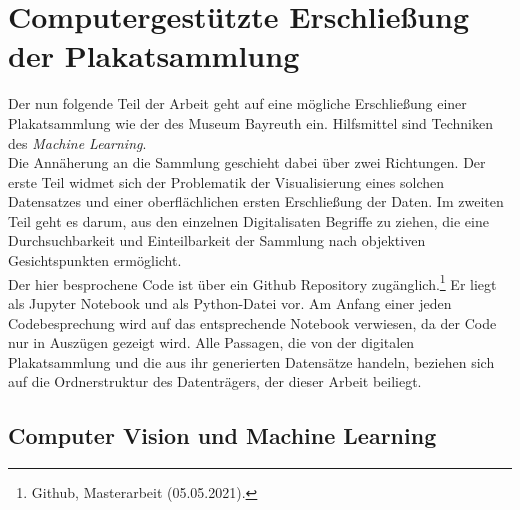\documentclass[a4paper,12pt,ngerman]{article}
\begin{document}
\section{Computergestützte Erschließung der Plakatsammlung}
Der nun folgende Teil der Arbeit geht auf eine mögliche Erschließung einer Plakatsammlung wie der des Museum Bayreuth ein. Hilfsmittel sind Techniken des \textit{Machine Learning}. \\
Die Annäherung an die Sammlung geschieht dabei über zwei Richtungen. Der erste Teil widmet sich der Problematik der Visualisierung eines solchen Datensatzes und einer oberflächlichen ersten Erschließung der Daten. Im zweiten Teil geht es darum, aus den einzelnen Digitalisaten Begriffe zu ziehen, die eine Durchsuchbarkeit und Einteilbarkeit der Sammlung nach objektiven Gesichtspunkten ermöglicht. \\
Der hier besprochene Code ist über ein Github Repository zugänglich.\footnote{Github, Masterarbeit (05.05.2021).} Er liegt als Jupyter Notebook und als Python-Datei vor. Am Anfang einer jeden Codebesprechung wird auf das entsprechende Notebook verwiesen, da der Code nur in Auszügen gezeigt wird. Alle Passagen, die von der digitalen Plakatsammlung und die aus ihr generierten Datensätze handeln, beziehen sich auf die Ordnerstruktur des Datenträgers, der dieser Arbeit beiliegt. \\

\subsection{Computer Vision und Machine Learning}
\end{document}
